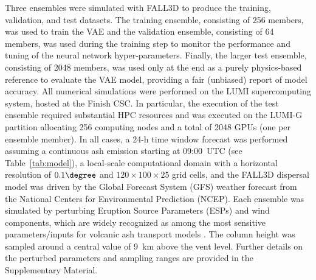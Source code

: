 Three ensembles were simulated with FALL3D to produce the training, validation, and test datasets. The training ensemble, consisting of 256 members, was used to train the VAE and the validation ensemble, consisting of 64 members, was used during the training step to monitor the performance and tuning of the neural network hyper-parameters. Finally, the larger test ensemble, consisting of 2048 members, was used only at the end as a purely physics-based reference to evaluate the VAE model, providing a fair (unbiased) report of model accuracy. All numerical simulations were performed on the LUMI  supercomputing system, hosted at the Finish CSC. In particular, the execution of the test ensemble required substantial HPC resources and was executed on the LUMI-G partition allocating 256 computing nodes and a total of 2048 GPUs (one per ensemble member).
%
In all cases, a 24-h time window forecast was performed assuming a continuous ash emission starting at 09:00~UTC (see Table~\ref{tab:model}), a local-scale computational domain with a horizontal resolution of $0.1\degree$ and $120 \times 100 \times 25$ grid cells, and the FALL3D dispersal model was driven by the Global Forecast System (GFS) weather forecast from the National Centers for Environmental Prediction (NCEP).
%
%
Each ensemble was simulated by perturbing Eruption Source Parameters (ESPs) and wind components, which are widely recognized as among the most sensitive parameters/inputs for volcanic ash transport models \citep{devenish2012,poulidis2018}. The column height was sampled around a central value of 9~\unit{km} above the vent level. Further details on the perturbed parameters and sampling ranges are provided in the Supplementary Material.

